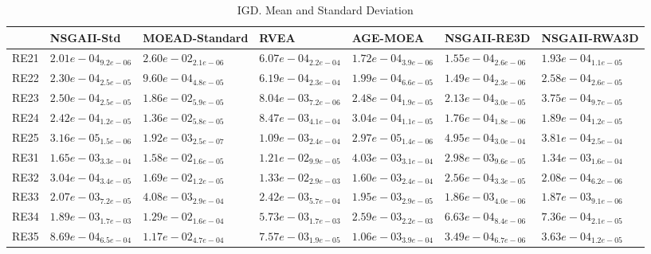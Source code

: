\documentclass{article}
\begin{document}
\begin{table}
\caption{IGD. Mean and Standard Deviation}
\label{table: IGD}
\centering
\begin{scriptsize}
\begin{tabular}{lllllll}
\hline & NSGAII-Std & MOEAD-Standard & RVEA & AGE-MOEA & NSGAII-RE3D &  NSGAII-RWA3D\\
\hline 
RE21 & $  2.01e-04_{ 9.2e-06}$ & $  2.60e-02_{ 2.1e-06}$ & $  6.07e-04_{ 2.2e-04}$ & \cellcolor{gray25}$  1.72e-04_{ 3.9e-06}$ & \cellcolor{gray95}$  1.55e-04_{ 2.6e-06}$ & $  1.93e-04_{ 1.1e-05}$ \\
RE22 & $  2.30e-04_{ 2.5e-05}$ & $  9.60e-04_{ 4.8e-05}$ & $  6.19e-04_{ 2.3e-04}$ & \cellcolor{gray25}$  1.99e-04_{ 6.6e-05}$ & \cellcolor{gray95}$  1.49e-04_{ 2.3e-06}$ & $  2.58e-04_{ 2.6e-05}$ \\
RE23 & $  2.50e-04_{ 2.5e-05}$ & $  1.86e-02_{ 5.9e-05}$ & $  8.04e-03_{ 7.2e-06}$ & \cellcolor{gray25}$  2.48e-04_{ 1.9e-05}$ & \cellcolor{gray95}$  2.13e-04_{ 3.0e-05}$ & $  3.75e-04_{ 9.7e-05}$ \\
RE24 & $  2.42e-04_{ 1.2e-05}$ & $  1.36e-02_{ 5.8e-05}$ & $  8.47e-03_{ 4.1e-04}$ & $  3.04e-04_{ 1.1e-05}$ & \cellcolor{gray95}$  1.76e-04_{ 1.8e-06}$ & \cellcolor{gray25}$  1.89e-04_{ 1.2e-05}$ \\
RE25 & \cellcolor{gray25}$  3.16e-05_{ 1.5e-06}$ & $  1.92e-03_{ 2.5e-07}$ & $  1.09e-03_{ 2.4e-04}$ & \cellcolor{gray95}$  2.97e-05_{ 1.4e-06}$ & $  4.95e-04_{ 3.0e-04}$ & $  3.81e-04_{ 2.5e-04}$ \\
RE31 & \cellcolor{gray25}$  1.65e-03_{ 3.3e-04}$ & $  1.58e-02_{ 1.6e-05}$ & $  1.21e-02_{ 9.9e-05}$ & $  4.03e-03_{ 3.1e-04}$ & $  2.98e-03_{ 9.6e-05}$ & \cellcolor{gray95}$  1.34e-03_{ 1.6e-04}$ \\
RE32 & $  3.04e-04_{ 3.4e-05}$ & $  1.69e-02_{ 1.2e-05}$ & $  1.33e-02_{ 2.9e-03}$ & $  1.60e-03_{ 2.4e-04}$ & \cellcolor{gray25}$  2.56e-04_{ 3.3e-05}$ & \cellcolor{gray95}$  2.08e-04_{ 6.2e-06}$ \\
RE33 & $  2.07e-03_{ 7.2e-05}$ & $  4.08e-03_{ 2.9e-04}$ & $  2.42e-03_{ 5.7e-04}$ & $  1.95e-03_{ 2.9e-05}$ & \cellcolor{gray95}$  1.86e-03_{ 4.0e-06}$ & \cellcolor{gray25}$  1.87e-03_{ 9.1e-06}$ \\
RE34 & $  1.89e-03_{ 1.7e-03}$ & $  1.29e-02_{ 1.6e-04}$ & $  5.73e-03_{ 1.7e-03}$ & $  2.59e-03_{ 2.2e-03}$ & \cellcolor{gray95}$  6.63e-04_{ 8.4e-06}$ & \cellcolor{gray25}$  7.36e-04_{ 2.1e-05}$ \\
RE35 & $  8.69e-04_{ 6.5e-04}$ & $  1.17e-02_{ 4.7e-04}$ & $  7.57e-03_{ 1.9e-05}$ & $  1.06e-03_{ 3.9e-04}$ & \cellcolor{gray95}$  3.49e-04_{ 6.7e-06}$ & \cellcolor{gray25}$  3.63e-04_{ 1.2e-05}$ \\

\end{tabular}
\end{scriptsize}
\end{table}
\end{document}
